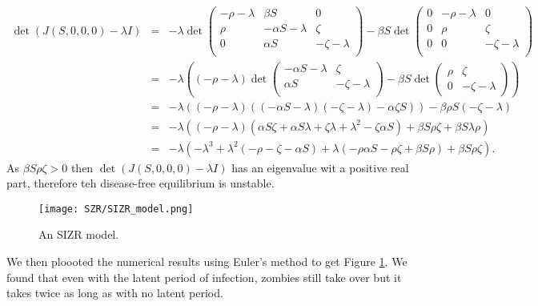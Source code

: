 \documentclass{mm2}
\numberwithin{equation}{section}
\theoremstyle{definition}
\begin{document}
\begin{eqnarray}
\det(J(S, 0, 0, 0)- \lambda I)&=&-\lambda \det \begin{pmatrix}
-\rho - \lambda & \beta S & 0 \\
\rho & -\alpha S - \lambda & \zeta \\
0 & \alpha S & -\zeta - \lambda \\
\end{pmatrix}
-\beta S \det 
\begin{pmatrix}
0 & -\rho - \lambda & 0 \\
0 & \rho & \zeta \\
0 & 0 & -\zeta - \lambda \\
\end{pmatrix} \nonumber \\
&=& -\lambda((-\rho - \lambda)\det \begin{pmatrix}
-\alpha S - \lambda & \zeta \\
\alpha S & -\zeta - \lambda \\
\end{pmatrix} - \beta S \det \begin{pmatrix}
\rho & \zeta \\
0 & -\zeta - \lambda
\end{pmatrix}) \nonumber \\
&=& -\lambda((-\rho - \lambda)((-\alpha S - \lambda)(-\zeta - \lambda)-\alpha \zeta S)) - \beta \rho S(-\zeta- \lambda) \nonumber \\
&=& - \lambda((-\rho - \lambda)(\alpha S \zeta + \alpha S \lambda + \zeta \lambda + \lambda ^ 2 -\zeta \alpha S) +\beta S \rho \zeta  + \beta S \lambda \rho) \nonumber \\
&=& -\lambda(-\lambda^3 + \lambda^2(-\rho - \zeta -\alpha S) + \lambda(-\rho \alpha S - \rho \zeta + \beta S \rho) + \beta S \rho \zeta).
\end{eqnarray} 
As $\beta S \rho \zeta > 0$ then $\det(J(S, 0, 0, 0)- \lambda I)$ has an eigenvalue wit a positive real part, therefore teh disease-free equilibrium is unstable. 
\begin{figure}[ht]
	\centering
	\texttt{[image: SZR/SIZR\_model.png]}
	\caption{An SIZR model.}
	\label{sizrgraph}
\end{figure}\newline
We then ploooted the numerical results using Euler's method to get Figure \ref{sizrgraph}. We found that even with the latent period of infection, zombies still take over but it takes twice as long as with no latent period.\newline
\end{document}
